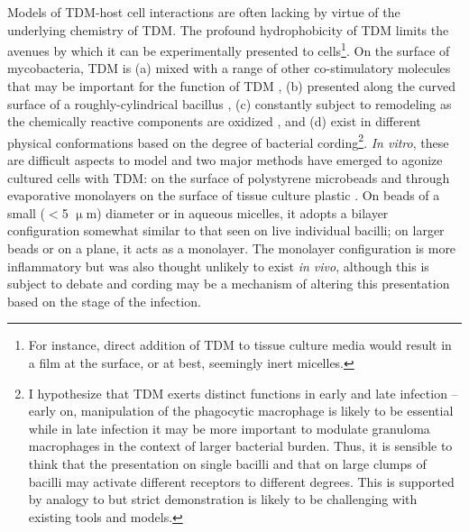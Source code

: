 Models of TDM\hyp{}host cell interactions are often lacking by virtue of the underlying chemistry of TDM. The profound hydrophobicity of TDM limits the avenues by which it can be experimentally presented to cells\footnote{For instance, direct addition of TDM to tissue culture media would result in a film at the surface, or at best, seemingly inert micelles.}. On the surface of mycobacteria, TDM is (a) mixed with a range of other co\hyp{}stimulatory molecules that may be important for the function of TDM \citep{Rhoades2003, Mazurek2012, Torrelles2010}, (b) presented along the curved surface of a roughly\hyp{}cylindrical bacillus \citep{McCarter1935},  (c) constantly subject to remodeling as the chemically reactive components are oxidized \citep{Hett2010, Meniche2014, Shaku2020, Chan1989}, and (d) exist in different physical conformations based on the degree of bacterial cording\footnote{I hypothesize that TDM exerts distinct functions in early and late infection -- early on, manipulation of the phagocytic macrophage is likely to be essential while in late infection it may be more important to modulate granuloma macrophages in the context of larger bacterial burden. Thus, it is sensible to think that the presentation on single bacilli and that on large clumps of bacilli may activate different receptors to different degrees. This is supported by analogy to \citet{Goodridge2011} but strict demonstration is likely to be challenging with existing tools and models.}. \textit{In vitro}, these are difficult aspects to model and two major methods have emerged to agonize cultured cells with TDM: on the surface of polystyrene microbeads \citep{Bloch1950, Bowdish2009, Indrigo2003, Retzinger1982, Behling1993, Geisel2005} and through evaporative monolayers on the surface of tissue culture plastic \citep{Schabbing1994, Harland2008, Hunter2006a, Ishikawa2009, Zhao2014, Miyake2013}. On beads of a small ($<$5 $\upmu$m) diameter or in aqueous micelles, it adopts a bilayer configuration somewhat similar to that seen on live individual bacilli; on larger beads or on a plane, it acts as a monolayer. The monolayer configuration is more inflammatory but was also thought unlikely to exist \textit{in vivo}, although this is subject to debate and cording may be a mechanism of altering this presentation based on the stage of the infection. 

